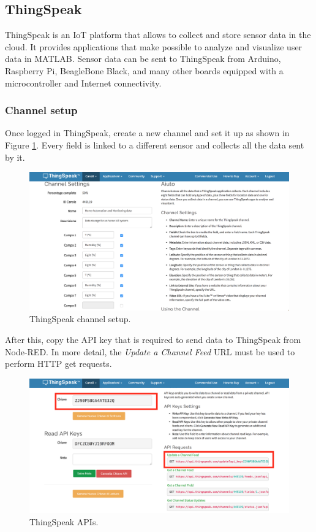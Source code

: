 \subsection{ThingSpeak}
ThingSpeak is an IoT platform that allows to collect and store sensor data in the cloud. It provides applications that make possible to analyze and visualize user data in MATLAB. Sensor data can be sent to ThingSpeak from Arduino, Raspberry Pi, BeagleBone Black, and many other boards equipped with a microcontroller and Internet connectivity.

\subsubsection{Channel setup}
Once logged in ThingSpeak, create a new channel and set it up as shown in Figure \ref{channel_setup}. Every field is linked to a different sensor and collects all the data sent by it.

\begin{figure}[H]
	\begin{center}
		\includegraphics[width=\textwidth]{./pictures/thingspeak-channels-setup}
		\caption{ThingSpeak channel setup.}
		\label{channel_setup}
	\end{center}
\end{figure}

\noindent
After this, copy the API key that is required to send data to ThingSpeak from Node-RED. In more detail, the \textit{Update a Channel Feed} URL must be used to perform HTTP get requests.

\begin{figure}[H]
	\begin{center}
		\includegraphics[width=\textwidth]{./pictures/thingspeak-apis}
		\caption{ThingSpeak APIs.}
		\label{thingspeak_apis}
	\end{center}
\end{figure}

